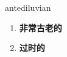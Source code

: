 
\begin{frame}
{\huge antediluvian}
\begin{center}
\begin{enumerate}\Large
  \item \textbf{非常古老的}
  \item \textbf{过时的}
\end{enumerate}
\end{center}
\end{frame}
